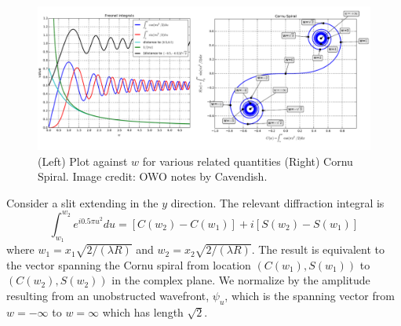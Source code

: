 \documentclass[a4paper]{article}
\begin{document}
\begin{figure}[H]
    \centering
    \includegraphics[width=\linewidth]{cornu.PNG}
    \caption{(Left) Plot against $w$ for various related quantities (Right) Cornu Spiral. Image credit: OWO notes by Cavendish.}
\end{figure}
\begin{eg}
Consider a slit extending in the $y$ direction. The relevant diffraction integral is
$$\int_{w_1}^{w_2}e^{i0.5\pi u^2}du=[C(w_2)-C(w_1)]+i[S(w_2)-S(w_1)]$$
where $w_1=x_1\sqrt{2/(\lambda R)}$ and $w_2=x_2\sqrt{2/(\lambda R)}$. The result is equivalent to the vector spanning the Cornu spiral from location $(C(w_1),S(w_1))$ to $(C(w_2),S(w_2))$ in the complex plane. We normalize by the amplitude resulting from an unobstructed wavefront, $\psi_u$, which is the spanning vector from $w=-\infty$ to $w=\infty$ which has length $\sqrt{2}$.
\end{eg}
\end{document}

